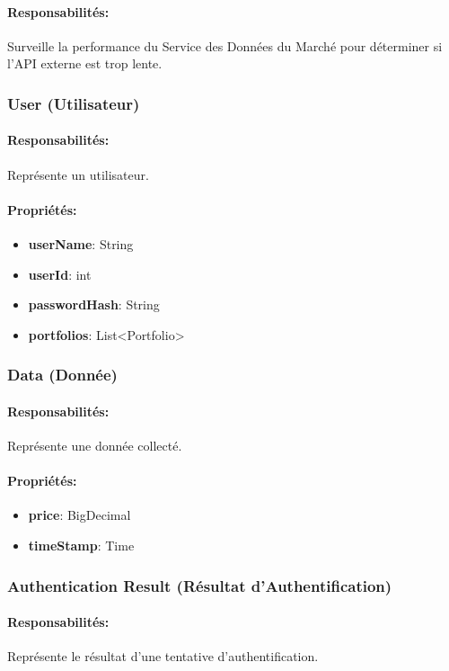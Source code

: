 \documentclass{article}
\begin{document}
\paragraph{Responsabilités:} Surveille la performance du Service des Données du Marché pour déterminer si l'API externe est trop lente.
\subsubsection{User (Utilisateur)}
\paragraph{Responsabilités:} Représente un utilisateur.
\paragraph{Propriétés:}
\begin{itemize}
  \item \textbf{userName}: String
  \item \textbf{userId}: int
  \item \textbf{passwordHash}: String
  \item \textbf{portfolios}: List<Portfolio>
\end{itemize}
\subsubsection{Data (Donnée)}
\paragraph{Responsabilités:} Représente une donnée collecté.
\paragraph{Propriétés:}
\begin{itemize}
  \item \textbf{price}: BigDecimal
  \item \textbf{timeStamp}: Time
\end{itemize}
\subsubsection{Authentication Result (Résultat d'Authentification)}
\paragraph{Responsabilités:} Représente le résultat d'une tentative d'authentification.
\end{document}
